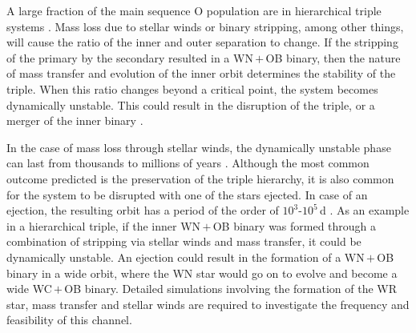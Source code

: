 
A large fraction of the main sequence O population are in hierarchical triple systems \citep[e.g.,][]{sana_southern_2014,moe_mind_2017}. Mass loss due to stellar winds or binary stripping, among other things, will cause the ratio of the inner and outer separation to change. If the stripping of the primary by the secondary resulted in a WN\,$+$\,OB binary, then the nature of mass transfer and evolution of the inner orbit determines the stability of the triple. When this ratio changes beyond a critical point, the system becomes dynamically unstable. This could result in the disruption of the triple, or a merger of the inner binary \citep{toonen_evolution_2020}.

In the case of mass loss through stellar winds, the dynamically unstable phase can last from thousands to millions of years \citep{toonen_stellar_2022}. Although the most common outcome predicted is the preservation of the triple hierarchy, it is also common for the system to be disrupted with one of the stars ejected. In case of an ejection, the resulting orbit has a period of the order of $10^3$-$10^5\,$d \citep{toonen_stellar_2022}. As an example in a hierarchical triple, if the inner WN\,$+$\,OB binary was formed through a combination of stripping via stellar winds and mass transfer, it could be dynamically unstable. An ejection could result in the formation of a WN\,$+$\,OB binary in a wide orbit, where the WN star would go on to evolve and become a wide WC\,$+$\,OB binary. Detailed simulations involving the formation of the WR star, mass transfer and stellar winds are required to investigate the frequency and feasibility of this channel.

